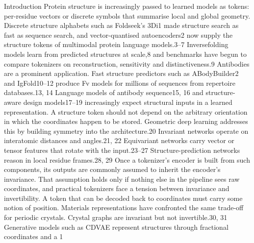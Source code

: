 \documentclass[11pt]{article}
\begin{document}
Introduction
Protein structure is increasingly passed to learned models as tokens: per-residue vectors or discrete symbols that summarise local and global geometry. Discrete structure alphabets such as
Foldseek’s 3Di1 made structure search as fast as sequence search, and vector-quantised autoencoders2 now supply the structure tokens of multimodal protein language models.3–7 Inversefolding models learn from predicted structures at scale,8 and benchmarks have begun to compare
tokenizers on reconstruction, sensitivity and distinctiveness.9 Antibodies are a prominent application. Fast structure predictors such as ABodyBuilder2 and IgFold10–12 produce Fv models for
millions of sequences from repertoire databases.13, 14 Language models of antibody sequence15, 16
and structure-aware design models17–19 increasingly expect structural inputs in a learned representation.
A structure token should not depend on the arbitrary orientation in which the coordinates happen
to be stored. Geometric deep learning addresses this by building symmetry into the architecture.20
Invariant networks operate on interatomic distances and angles.21, 22 Equivariant networks carry
vector or tensor features that rotate with the input.23–27 Structure-prediction networks reason in
local residue frames.28, 29 Once a tokenizer’s encoder is built from such components, its outputs
are commonly assumed to inherit the encoder’s invariance.
That assumption holds only if nothing else in the pipeline sees raw coordinates, and practical
tokenizers face a tension between invariance and invertibility. A token that can be decoded back
to coordinates must carry some notion of position. Materials representations have confronted
the same trade-off for periodic crystals. Crystal graphs are invariant but not invertible.30, 31
Generative models such as CDVAE represent structures through fractional coordinates and a
1
\end{document}
